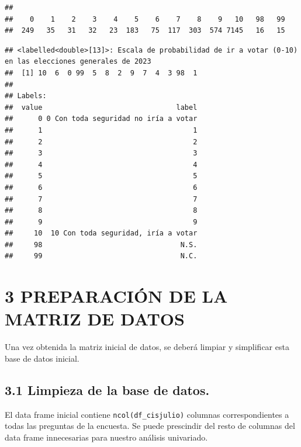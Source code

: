 \documentclass[
]{article}
\newenvironment{Shaded}{\begin{snugshade}}{\end{snugshade}}
\newcommand{\FunctionTok}[1]{\textcolor[rgb]{0.13,0.29,0.53}{\textbf{#1}}}
\newcommand{\NormalTok}[1]{#1}
\newcommand{\SpecialCharTok}[1]{\textcolor[rgb]{0.81,0.36,0.00}{\textbf{#1}}}
\begin{document}
\begin{verbatim}
## 
##    0    1    2    3    4    5    6    7    8    9   10   98   99 
##  249   35   31   32   23  183   75  117  303  574 7145   16   15
\end{verbatim}

\begin{Shaded}
\end{Shaded}

\begin{verbatim}
## <labelled<double>[13]>: Escala de probabilidad de ir a votar (0-10) en las elecciones generales de 2023
##  [1] 10  6  0 99  5  8  2  9  7  4  3 98  1
## 
## Labels:
##  value                                label
##      0 0 Con toda seguridad no iría a votar
##      1                                    1
##      2                                    2
##      3                                    3
##      4                                    4
##      5                                    5
##      6                                    6
##      7                                    7
##      8                                    8
##      9                                    9
##     10  10 Con toda seguridad, iría a votar
##     98                                 N.S.
##     99                                 N.C.
\end{verbatim}

\hypertarget{preparaciuxf3n-de-la-matriz-de-datos}{%
\section{3 PREPARACIÓN DE LA MATRIZ DE
DATOS}\label{preparaciuxf3n-de-la-matriz-de-datos}}

Una vez obtenida la matriz inicial de datos, se deberá limpiar y
simplificar esta base de datos inicial.

\hypertarget{limpieza-de-la-base-de-datos.}{%
\subsection{3.1 Limpieza de la base de
datos.}\label{limpieza-de-la-base-de-datos.}}

El data frame inicial contiene \texttt{ncol(df\_cisjulio)} columnas
correspondientes a todas las preguntas de la encuesta. Se puede
prescindir del resto de columnas del data frame innecesarias para
nuestro análisis univariado.
\end{document}
